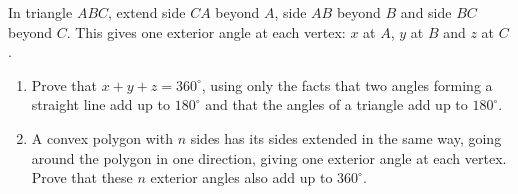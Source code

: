 In triangle $ABC$, extend side $CA$ beyond $A$, side $AB$ beyond $B$ and side $BC$ beyond $C$. This gives one exterior angle at each vertex: $x$ at $A$, $y$ at $B$ and $z$ at $C$.
\begin{enumerate}
\item[(a)] Prove that $x+y+z=360^\circ$, using only the facts that two angles forming a straight line add up to $180^\circ$ and that the angles of a triangle add up to $180^\circ$.
\item[(b)] A convex polygon with $n$ sides has its sides extended in the same way, going around the polygon in one direction, giving one exterior angle at each vertex. Prove that these $n$ exterior angles also add up to $360^\circ$.
\end{enumerate}
